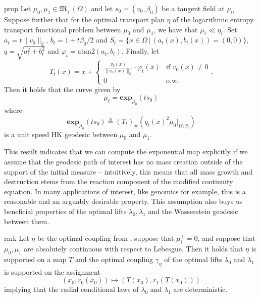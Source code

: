 \documentclass[11pt]{article}
\begin{document}
\begin{restatable}{prop}{} \label{HK exponential map closed form}
    Let $\mu_0, \mu_1 \in \mathfrak{M}_+(\Omega)$ and let $s_0 = (v_0, \beta_0)$ be a tangent field at $\mu_0$. Suppose further that for the optimal transport plan $\eta$ of the logarithmic entropy transport functional problem between $\mu_0$ and $\mu_1$, we have that $\mu_i \ll \eta_i$. Set $a_t = t\|v_0\|_2$, $b_t = 1 + t\beta_0/2$ and $S_t = \{x \in \Omega \, | \, (a_t(x), b_t(x)) = (0, 0) \}$, $q = \sqrt{a_t^2 + b_t^2}$ and $\varphi_t = \text{atan2}(a_t, b_t).$ Finally, let 
    \[T_t ( x) = x + \begin{cases}
        \frac{v_0(x)}{\|v_0(x)\|_2}\cdot \varphi_t(x) & \text{if } v_0(x) \neq 0 \\
        0 & \text{o.w.}
    \end{cases}.\]
    Then it holds that the curve given by 
    \begin{equation*}
        \mu_t = \mathbf{exp}_{\mu_0}(ts_0)
    \end{equation*}
    where 
    \[\mathbf{exp}_{\mu_0}(ts_0) \triangleq (T_t)_\#(q_t(x)^2 \mu_0|_{\Omega \setminus S_t})\]
    is a unit speed HK geodesic between $\mu_0$ and $\mu_1$.  
\end{restatable}
This result indicates that we can compute the exponential map explicitly if we assume that the geodesic path of interest has no mass creation outside of the support of the initial measure -- intuitively, this means that all mass growth and destruction stems from the reaction component of the modified continuity equation. In many applications of interest, like genomics for example, this is a reasonable and an arguably desirable property. This assumption also buys us beneficial properties of the optimal lifts $\lambda_0, \lambda_1$ and the Wasserstein geodesic between them.
\begin{restatable}{rmk}{} \label{clancy coupling supported on a map}
    Let $\eta$ be the optimal coupling from , suppose that $\mu_i^\perp = 0$, and suppose that $\mu_0, \mu_1$ are absolutely continuous with respect to Lebesgue. Then it holds that $\eta$ is supported on a map $T$ and the optimal coupling $\gamma_\eta$ of the optimal lifts $\lambda_0$ and $\lambda_1$ is supported on the assignment
    \[(x_0, r_0(x_0)) \mapsto (T(x_0), r_1(T(x_0))) \]
    implying that the radial conditional laws of $\lambda_0$ and $\lambda_1$ are deterministic. 
\end{restatable} 
\end{document}
